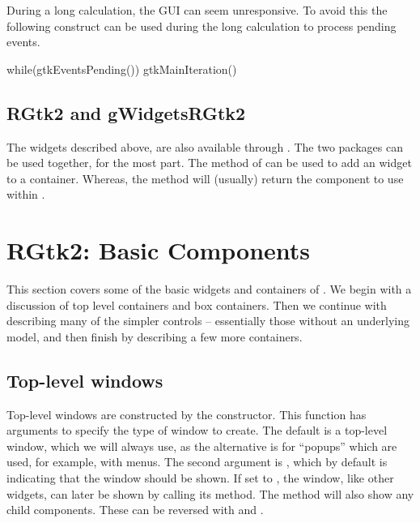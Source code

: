 During a long calculation, the GUI can seem unresponsive. To avoid
this the following construct can be used during the long calculation
to process pending events.

\begin{Schunk}
\begin{Sinput}
 while(gtkEventsPending()) 
   gtkMainIteration()
\end{Sinput}
\end{Schunk}



\section{RGtk2 and gWidgetsRGtk2}
\label{sec:RGtk2:gWidgetsRGtk2}


The widgets described above, are also available through
. The two packages can be used together, for the
most part. The  method of  can be used to
add an  widget to a 
container. Whereas, the  method will (usually)
return the  component to use within .


\chapter{RGtk2: Basic Components}
\label{sec:top-level-windows}




This section covers some of the basic widgets and containers of
\GTK. We begin with a discussion of top level containers and box
containers. Then we continue with describing many of the simpler
controls -- essentially those without an underlying model, and then
finish by describing a few more containers. 

\section{Top-level windows}
\label{sec:RGtk2:gtkWindow}

Top-level windows are constructed by the 
constructor. This function has arguments  to specify the
type of window to create. The default is a top-level window, which we
will always use, as the alternative is for ``popups'' which are used,
for example, with menus. The second argument is , which by
default is  indicating that the window should be shown. If
set to , the window, like other widgets, can later be
shown by calling its  method. The  method
will also show any child components. These can be reversed with
 and .


